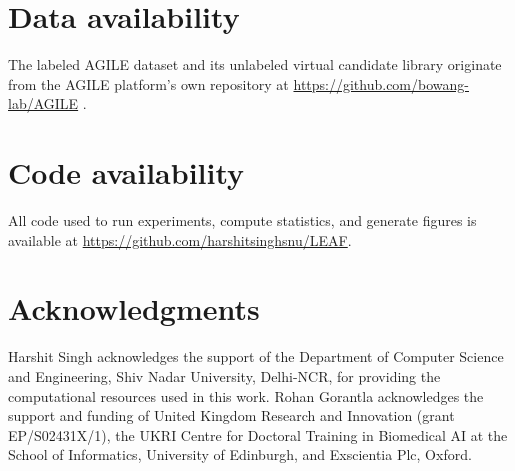 \documentclass[11pt]{article}
\begin{document}
\section*{Data availability}
The labeled AGILE dataset and its unlabeled virtual candidate library  originate from the AGILE platform's own repository at \url{https://github.com/bowang-lab/AGILE} \citep{xu2024agile}. 
 

\section*{Code availability}
All code used to run experiments, compute statistics, and generate figures is available at \url{https://github.com/harshitsinghsnu/LEAF}.

\section*{Acknowledgments}
Harshit Singh acknowledges the support of the Department of Computer Science and Engineering, Shiv Nadar University, Delhi-NCR, for providing the computational resources used in this work. Rohan Gorantla acknowledges the support and funding of United Kingdom Research and Innovation (grant EP/S02431X/1), the UKRI Centre for Doctoral Training in Biomedical AI at the School of Informatics, University of Edinburgh, and Exscientia Plc, Oxford.

\label{main-text-end}
\clearpage



\clearpage
\appendix

\end{document}

